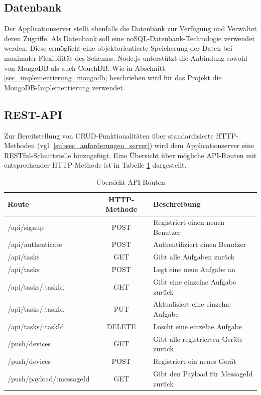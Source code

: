 \subsection{Datenbank}

Der Applicationserver stellt ebenfalls die Datenbank zur Verfügung und Verwaltet deren Zugriffe. Als Datenbank soll eine noSQL-Datenbank-Technologie verwendet werden. Diese ermöglicht eine objektorientierte Speicherung der Daten bei maximaler Flexibilität des Schemas. Node.js unterstützt die Anbindung sowohl von MongoDB als auch CouchDB. Wie in Abschnitt \ref{sec_implementierung_mongodb} beschrieben wird für das Projekt die MongoDB-Implementierung verwendet.

\subsection{REST-API}

Zur Bereitstellung von CRUD-Funktionalitäten über standardisierte HTTP-Methoden (vgl. \ref{subsec_anforderungen_server}) wird dem Applicationserver eine RESTful-Schnittstelle hinzugefügt. Eine Übersicht über mögliche API-Routen mit entsprechender HTTP-Methode ist in Tabelle \ref{tbl_konzeption_rest} dargestellt. 

\begin{table}[h]
\centering
\begin{tabular}{l | c | l }
    \textbf{Route} & \textbf{HTTP-Methode} & \textbf{Beschreibung} \\
    \hline\hline
    /api/signup & POST & Registriert einen neuen Benutzer \\
    /api/authenticate & POST & Authentifiziert einen Benutzer \\
    \hline
    /api/tasks & GET & Gibt alle Aufgaben zurück \\
    /api/tasks & POST & Legt eine neue Aufgabe an \\
    /api/tasks/:taskId & GET & Gibt eine einzelne Aufgabe zurück \\
    /api/tasks/:taskId & PUT & Aktualisiert eine einzelne Aufgabe \\
    /api/tasks/:taskId & DELETE & Löscht eine einzelne Aufgabe \\
    \hline
    /push/devices & GET & Gibt alle registrierten Geräte zurück \\
    /push/devices & POST & Registriert ein neues Gerät \\
    /push/payload/:messageId & GET & Gibt den Payload für MessageId zurück \\
\end{tabular}
\caption{Übersicht API Routen}
\label{tbl_konzeption_rest}
\end{table}

